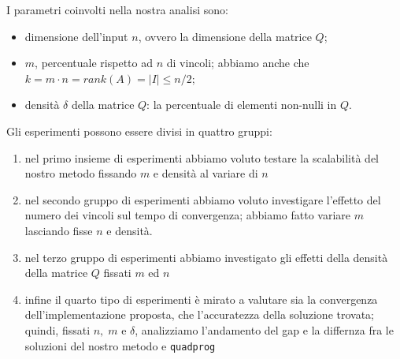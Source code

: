 I parametri coinvolti nella nostra analisi sono:
\begin{itemize}
    \item dimensione dell'input $n$, ovvero la dimensione della matrice $Q$;
    \item $m$, percentuale rispetto ad $n$ di vincoli; abbiamo anche che $k=m\cdot n = rank(A) = |I| \leq n/2$;
    \item densità $\delta$ della matrice $Q$: la percentuale di elementi non-nulli in $Q$.
\end{itemize}

Gli esperimenti possono essere divisi in quattro gruppi:
\begin{enumerate}
    \item nel primo insieme di esperimenti abbiamo voluto testare la scalabilità del nostro metodo fissando $m$ e densità al variare di $n$
    \item nel secondo gruppo di esperimenti abbiamo voluto investigare l'effetto del numero dei vincoli sul tempo di convergenza; abbiamo fatto variare $m$ lasciando fisse $n$ e densità.
    \item nel terzo gruppo di esperimenti abbiamo investigato gli effetti della densità della matrice $Q$ fissati $m$ ed $n$
    \item infine il quarto tipo di esperimenti è mirato a valutare sia la convergenza dell'implementazione proposta, che l'accuratezza della soluzione trovata; quindi, fissati $n, \; m$ e $\delta$, analizziamo l'andamento del gap e la differnza fra le soluzioni del nostro metodo e \texttt{quadprog}
\end{enumerate}

